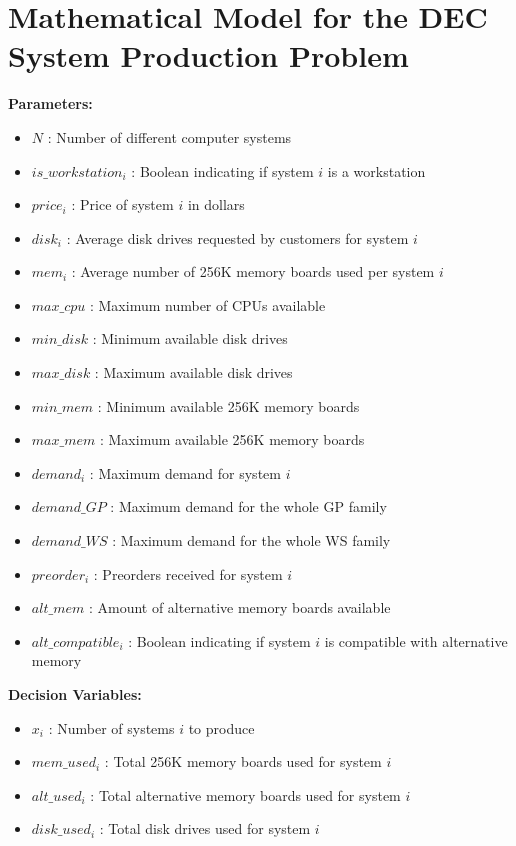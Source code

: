 \documentclass{article}
\begin{document}
\section*{Mathematical Model for the DEC System Production Problem}

\textbf{Parameters:}
\begin{itemize}
    \item $N$ : Number of different computer systems
    \item $is\_workstation_i$ : Boolean indicating if system $i$ is a workstation
    \item $price_i$ : Price of system $i$ in dollars
    \item $disk_i$ : Average disk drives requested by customers for system $i$
    \item $mem_i$ : Average number of 256K memory boards used per system $i$
    \item $max\_cpu$ : Maximum number of CPUs available
    \item $min\_disk$ : Minimum available disk drives
    \item $max\_disk$ : Maximum available disk drives
    \item $min\_mem$ : Minimum available 256K memory boards
    \item $max\_mem$ : Maximum available 256K memory boards
    \item $demand_i$ : Maximum demand for system $i$
    \item $demand\_GP$ : Maximum demand for the whole GP family
    \item $demand\_WS$ : Maximum demand for the whole WS family
    \item $preorder_i$ : Preorders received for system $i$
    \item $alt\_mem$ : Amount of alternative memory boards available
    \item $alt\_compatible_i$ : Boolean indicating if system $i$ is compatible with alternative memory
\end{itemize}

\textbf{Decision Variables:}
\begin{itemize}
    \item $x_i$ : Number of systems $i$ to produce
    \item $mem\_used_i$ : Total 256K memory boards used for system $i$
    \item $alt\_used_i$ : Total alternative memory boards used for system $i$
    \item $disk\_used_i$ : Total disk drives used for system $i$
\end{itemize}
\end{document}

